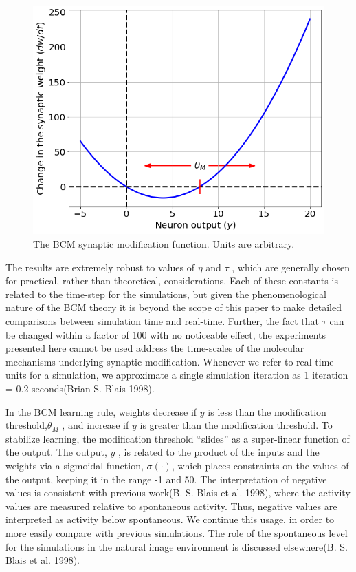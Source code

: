 \documentclass[
  letterpaper,
  DIV=11,
  numbers=noendperiod]{scrreprt}
\begin{document}
\begin{figure}[H]

{\centering \includegraphics{./Synaptic Modification_files/figure-pdf/fig-phi-output-1.png}

}

\caption{\label{fig-phi}The BCM synaptic modification function. Units
are arbitrary.}

\end{figure}

The results are extremely robust to values of \(\eta\) and \(\tau\) ,
which are generally chosen for practical, rather than theoretical,
considerations. Each of these constants is related to the time-step for
the simulations, but given the phenomenological nature of the BCM theory
it is beyond the scope of this paper to make detailed comparisons
between simulation time and real-time. Further, the fact that \(\tau\)
can be changed within a factor of 100 with no noticeable effect, the
experiments presented here cannot be used address the time-scales of the
molecular mechanisms underlying synaptic modification. Whenever we refer
to real-time units for a simulation, we approximate a single simulation
iteration as 1 iteration = 0.2 seconds(Brian S. Blais 1998).

In the BCM learning rule, weights decrease if \(y\) is less than the
modification threshold,\(\theta_M\) , and increase if \(y\) is greater
than the modification threshold. To stabilize learning, the modification
threshold ``slides'' as a super-linear function of the output. The
output, \(y\) , is related to the product of the inputs and the weights
via a sigmoidal function, \(\sigma(\cdot)\), which places constraints on
the values of the output, keeping it in the range -1 and 50. The
interpretation of negative values is consistent with previous work(B. S.
Blais et al. 1998), where the activity values are measured relative to
spontaneous activity. Thus, negative values are interpreted as activity
below spontaneous. We continue this usage, in order to more easily
compare with previous simulations. The role of the spontaneous level for
the simulations in the natural image environment is discussed
elsewhere(B. S. Blais et al. 1998).
\end{document}
